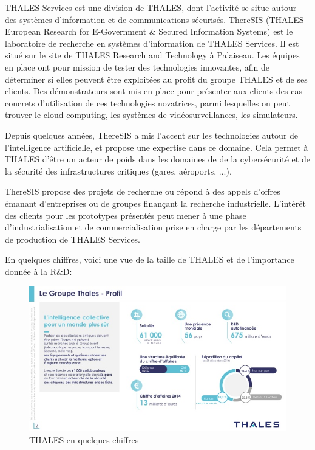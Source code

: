 THALES Services est une division de THALES, dont l’activité se situe autour des
systèmes d’information et de communications sécurisés.
ThereSIS (THALES European Research for E-Government & Secured Information
Systems) est le laboratoire de recherche en systèmes d’information de THALES
Services. Il est situé sur le site de THALES Research and Technology à Palaiseau.
Les équipes en place ont pour mission de tester des technologies
innovantes, afin de déterminer si elles peuvent être exploitées au profit du
groupe THALES et de ses clients. Des démonstrateurs sont mis en place pour
présenter aux clients des cas concrets d’utilisation de ces technologies
novatrices, parmi lesquelles on peut trouver le cloud computing, les systèmes de
vidéosurveillances, les simulateurs.

Depuis quelques années, ThereSIS a mis l'accent sur les technologies autour de l'intelligence artificielle, et propose une expertise dans ce domaine. Cela permet à THALES d'être un acteur de poids dans les domaines de de la cybersécurité et de la sécurité des infrastructures critiques (gares, aéroports, ...).

ThereSIS propose des projets de recherche ou répond à des appels d’offres
émanant d’entreprises ou de groupes finançant la recherche industrielle. L’intérêt
des clients pour les prototypes présentés peut mener à une phase
d’industrialisation et de commercialisation prise en charge par les départements
de production de THALES Services.

\bigskip
En quelques chiffres, voici une vue de la taille de THALES et de l'importance donnée à la R&D: 
\bigskip
\begin{figure}[!h]
\centering
\includegraphics[width=.9\linewidth]{./assets/thales_chiffres}
\caption{THALES en quelques chiffres}
\medskip
\small
\end{figure}
